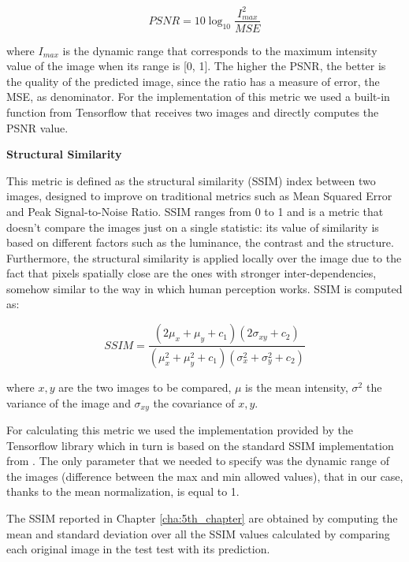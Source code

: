 \begin{equation} \label{eq:psnr}
PSNR =  10\log_{10} \frac{I^2_{max}}{MSE}
\end{equation}

where $I_{max}$ is the dynamic range that corresponds to the maximum intensity value of the image when its range is [0, 1].
The higher the PSNR, the better is the quality of the predicted image, since the ratio has a measure of error, the MSE, as denominator. For the implementation of this metric we used a built-in function from Tensorflow that receives two images and directly computes the PSNR value.

\vspace{6mm} 
\noindent\textbf{Structural Similarity}


\vspace{2mm}
\noindent This metric is defined as the structural similarity (SSIM) index between two images, designed to improve on traditional metrics such as Mean Squared Error and Peak Signal-to-Noise Ratio. 
SSIM ranges from 0 to 1 and is a metric that doesn't compare the images just on a single statistic: its value of similarity is based on different factors such as the luminance, the contrast and the structure. Furthermore, the structural similarity is applied locally over the image due to the fact that pixels spatially close are the ones with stronger inter-dependencies, somehow similar to the way in which human perception works. SSIM is computed as:

\begin{equation} \label{eq:ssim}
SSIM =  \frac{(2\mu_x + \mu_y + c_1)(2\sigma_{xy} + c_2)}{(\mu^2_x + \mu^2_y + c_1)(\sigma^2_x + \sigma^2_y + c_2)}
\end{equation}

where $x, y$ are the two images to be compared, $\mu$ is the mean intensity, $\sigma^2$ the variance of the image and $\sigma_{xy}$ the covariance of $x, y$.

\vspace{5mm} %
For calculating this metric we used the implementation provided by the Tensorflow library which in turn is based on the standard SSIM implementation from \cite{ssim}. The only parameter that we needed to specify was the dynamic range of the images (difference between the max and min allowed values), that in our case, thanks to the mean normalization, is equal to 1. 

The SSIM reported in Chapter \ref{cha:5th_chapter} are obtained by computing the mean and standard deviation over all the SSIM values calculated by comparing each original image in the test test with its prediction. 

